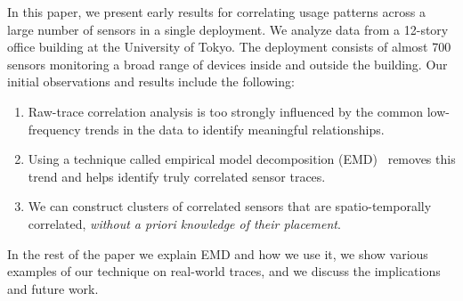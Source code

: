 In this paper, we present early results for correlating usage patterns across a large number of sensors
in a single deployment.  We analyze data from a 12-story office building at the University of Tokyo.  
The deployment consists of almost 700 sensors monitoring a broad range of devices inside and outside 
the building.  Our initial observations and results include the following:

\begin{enumerate}
\item Raw-trace correlation analysis is too strongly influenced by the common low-frequency trends in the data
	to identify meaningful relationships.
\item Using a technique called empirical model decomposition (EMD)~\cite{huang:emd1998} removes this 
		 trend and helps identify truly correlated sensor traces.
\item We can construct clusters of correlated sensors that are spatio-temporally correlated, \emph{without
		a priori knowledge of their placement}.
\end{enumerate}

In the rest of the paper we explain EMD and how we use it, we show various examples of our technique on real-world
traces, and we discuss the implications and future work.







